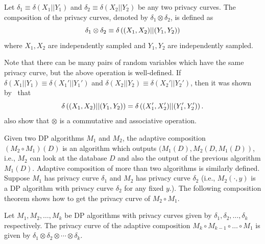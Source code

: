 \begin{definition}
	Let $\delta_1\equiv \delta(X_1||Y_1)$ and $\delta_2\equiv \delta(X_2||Y_2)$ be any two privacy curves. The composition of the privacy curves, denoted by $\delta_1 \otimes \delta_2$, is defined as $$\delta_1 \otimes \delta_2 \equiv \delta\left((X_1,X_2)||(Y_1,Y_2)\right)$$ where $X_1,X_2$ are independently sampled and $Y_1,Y_2$ are independently sampled.
\end{definition}
Note that there can be many pairs of random variables which have the same privacy curve, but the above operation is well-defined. If $\delta(X_1||Y_1)\equiv \delta(X_1'||Y_1')$ and $\delta(X_2||Y_2)\equiv \delta(X_2'||Y_2')$, then it was shown by~\cite{DongRS19} that $$\delta\left((X_1,X_2)||(Y_1,Y_2)\right)=\delta\left((X_1',X_2')||(Y_1',Y_2')\right).$$ \cite{DongRS19} also show that $\otimes$ is a commutative and associative operation.

Given two DP algorithms $M_1$ and $M_2$, the adaptive composition $(M_2 \circ M_1)(D)$ is an algorithm which outputs $(M_1(D),M_2(D,M_1(D))$, i.e., $M_2$ can look at the database $D$ and also the output of the previous algorithm $M_1(D)$. Adaptive composition of more than two algorithms is similarly defined. Suppose $M_1$ has privacy curve $\delta_1$ and $M_2$ has privacy curve $\delta_2$ (i.e., $M_2(\cdot, y)$ is a DP algorithm with privacy curve $\delta_2$ for any fixed $y.$). The following composition theorem shows how to get the privacy curve of $M_2 \circ M_1.$
\begin{theorem}
\label{prop:composition}
	Let $M_1,M_2,\dots,M_k$ be DP algorithms with privacy curves given by $\delta_1,\delta_2,\dots,\delta_k$ respectively. The privacy curve of the adaptive composition $M_k\circ M_{k-1} \circ \dots \circ M_1$ is given by $\delta_1\otimes \delta_2 \otimes \cdots \otimes \delta_k.$
\end{theorem}






